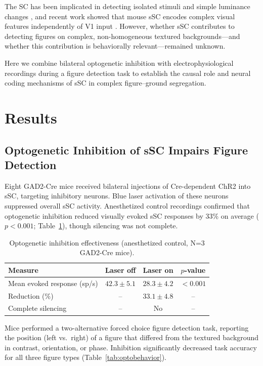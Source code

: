 \documentclass[11pt]{article}
\begin{document}
The SC has been implicated in detecting isolated stimuli and simple luminance changes \citep{dean1989visual, boehnke2011colliculus}, and recent work showed that mouse sSC encodes complex visual features independently of V1 input \citep{feinberg2021mouse, hoy2019defined}. However, whether sSC contributes to detecting figures on complex, non-homogeneous textured backgrounds---and whether this contribution is behaviorally relevant---remained unknown.

Here we combine bilateral optogenetic inhibition with electrophysiological recordings during a figure detection task to establish the causal role and neural coding mechanisms of sSC in complex figure--ground segregation.

\section{Results}

\subsection{Optogenetic Inhibition of sSC Impairs Figure Detection}

Eight GAD2-Cre mice \citep{taniguchi2011gad2} received bilateral injections of Cre-dependent ChR2 into sSC, targeting inhibitory neurons. Blue laser activation of these neurons suppressed overall sSC activity. Anesthetized control recordings confirmed that optogenetic inhibition reduced visually evoked sSC responses by 33\% on average ($p<0.001$; Table~\ref{tab:inhibition}), though silencing was not complete.

\begin{table}[H]
\centering
\caption{Optogenetic inhibition effectiveness (anesthetized control, N=3 GAD2-Cre mice).}
\label{tab:inhibition}
\begin{tabular}{lccc}
\toprule
\textbf{Measure} & \textbf{Laser off} & \textbf{Laser on} & \textbf{$p$-value} \\
\midrule
Mean evoked response (sp/s) & $42.3 \pm 5.1$ & $28.3 \pm 4.2$ & $<0.001$ \\
Reduction (\%) & -- & $33.1 \pm 4.8$ & -- \\
Complete silencing & -- & No & -- \\
\bottomrule
\end{tabular}
\end{table}

Mice performed a two-alternative forced choice figure detection task, reporting the position (left vs.\ right) of a figure that differed from the textured background in contrast, orientation, or phase. Inhibition significantly decreased task accuracy for all three figure types (Table~\ref{tab:optobehavior}).
\end{document}
